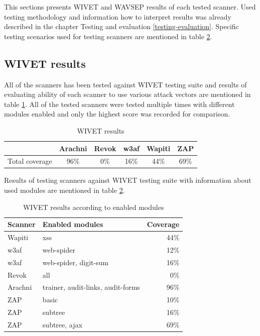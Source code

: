 	This sections presents WIVET and WAVSEP results of each tested scanner. Used testing methodology and information how to interpret results was already described in the chapter Testing and evaluation \ref{testing-evaluation}. Specific testing scenarios used for testing scanners are mentioned in table \ref{tab:resultsWivetDetailed}.

	\subsection{WIVET results}\label{wivet-results}	
	
	All of the scanners has been tested against WIVET testing suite and results of evaluating ability of each scanner to use various attack vectors are mentioned in table \ref{tab:resultsWivet}. All of the tested scanners were tested multiple times with different modules enabled and only the highest score was recorded for comparison.
	
	\begin {table}[H]
	\begin{center}
	\bgroup
	\def\arraystretch{1.2}
	\begin{tabular}{| l | ccccc |}
    \hline
	 & Arachni	& Revok & w3af	& Wapiti	& ZAP \\ \hline
	Total coverage & 96\%		& 0\%	& 16\%	& 44\%		& 69\%	\\ \hline
	\end{tabular}
	\egroup
	\caption{WIVET results}
	\label{tab:resultsWivet} 
	\end{center}
	\end {table}
	
	Results of testing scanners against WIVET testing suite with information about used modules are mentioned in table \ref{tab:resultsWivetDetailed}.
	
	\begin {table}[H]
	\begin{center}
	\bgroup
	\def\arraystretch{1.2}
	\begin{tabular}{| l | l | r |}
    \hline
	Scanner & Enabled modules	& Coverage  \\ \hline
	Wapiti	& xss				& 44\%		\\ \hline
	w3af	& web-spider		& 12\%		\\ \hline
	w3af	& web-spider, digit-sum & 16\%	\\ \hline
	Revok	& all				& 0\%		\\ \hline
	Arachni	& trainer, audit-links, audit-forms	& 96\% \\ \hline
	ZAP		& basic				& 10\%		\\ \hline
	ZAP		& subtree			& 16\%		\\ \hline
	ZAP		& subtree, ajax		& 69\%		\\ \hline	
	\end{tabular}
	\egroup
	\caption{WIVET results according to enabled modules}
	\label{tab:resultsWivetDetailed} 
	\end{center}
	\end {table}	
	
